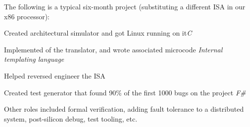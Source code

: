 \documentclass[letterpaper]{scrartcl}
\begin{document}
\begin{list1}
  \begin{list2}
  \item The following is a typical six-month project (substituting a different ISA in our x86 processor):
    \begin{list3}
    \item Created architectural simulator and got Linux running on it\hfill \emph{C}
    \item Implemented  of the translator, and wrote associated microcode \hfill \emph{Internal templating language}
    \item Helped reversed engineer the ISA
    \item Created test generator that found 90\% of the first 1000 bugs on the project \hfill \emph{F\#}
    \end{list3}
  \item Other roles included formal verification, adding fault tolerance to a distributed system, post-silicon debug, test tooling, etc.
    
    



\end{list2}
\end{list1}
\end{document}
